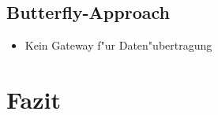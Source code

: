 \documentclass[11pt]{scrartcl}
\newif\iffull
\begin{document}
\subsection{Butterfly-Approach}

\begin{itemize}
	\item Kein Gateway f"ur Daten"ubertragung
\end{itemize}

\section{Fazit}

\iffull
\newpage

\addcontentsline{toc}{section}{\bibname}


\fi
\end{document}

